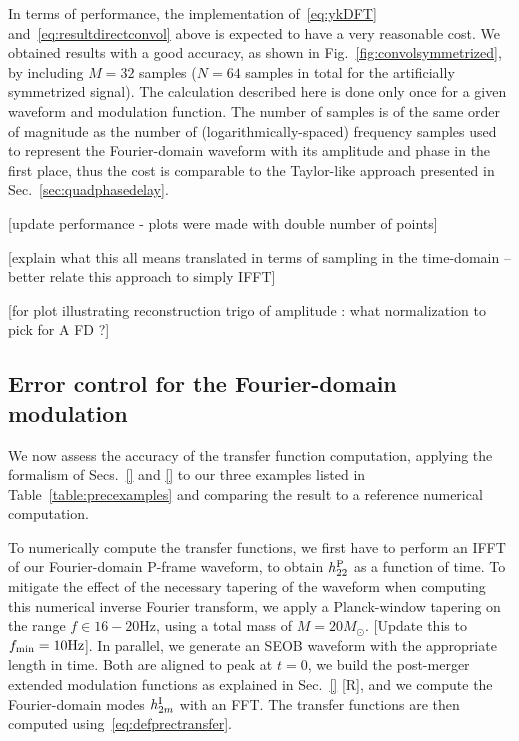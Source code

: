 \documentclass[aps,showpacs,twocolumn,
prd,superscriptaddress,nofootinbib]{revtex4-1}
\newcommand{\Msol}{M_{\odot}}
\newcommand{\SM}[1]{{\color{Red} #1}}
\begin{document}
In terms of performance, the implementation of~\eqref{eq:ykDFT} and~\eqref{eq:resultdirectconvol} above is expected to have a very reasonable cost. We obtained results with a good accuracy, as shown in Fig.~\ref{fig:convolsymmetrized}, by including $M=32$ samples ($N=64$ samples in total for the artificially symmetrized signal). The calculation described here is done only once for a given waveform and modulation function. The number of samples is of the same order of magnitude as the number of (logarithmically-spaced) frequency samples used to represent the Fourier-domain waveform with its amplitude and phase in the first place, thus the cost is comparable to the Taylor-like approach presented in Sec.~\ref{sec:quadphasedelay}.

\SM{[update performance - plots were made with double number of points]}

\SM{[explain what this all means translated in terms of sampling in the time-domain -- better relate this approach to simply IFFT]}

\SM{[for plot illustrating reconstruction trigo of amplitude : what normalization to pick for A FD ?]}


\subsection{Error control for the Fourier-domain modulation}
\label{subsec:errorsPrec}

We now assess the accuracy of the transfer function computation, applying the formalism of Secs.~\ref{} and \ref{} to our three examples listed in Table~\ref{table:precexamples} and comparing the result to a reference numerical computation.

To numerically compute the transfer functions, we first have to perform an IFFT of our Fourier-domain P-frame waveform, to obtain $h^{\rm P}_{22}$ as a function of time. To mitigate the effect of the necessary tapering of the waveform when computing this numerical inverse Fourier transform, we apply a Planck-window tapering on the range $f\in 16-20 \text{Hz}$, using a total mass of $M=20 \Msol$. \SM{[Update this to $f_{\rm min} = 10\text{Hz}$]}. In parallel, we generate an SEOB waveform with the appropriate length in time. Both are aligned to peak at $t=0$, we build the post-merger extended modulation functions as explained in Sec.~\ref{} \SM{[R]}, and we compute the Fourier-domain modes $h^{\rm I}_{2m}$ with an FFT. The transfer functions are then computed using~\eqref{eq:defprectransfer}.
\end{document}
